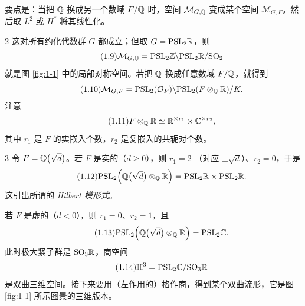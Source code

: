 
要点是：当把 $\mathbb{Q}$ 换成另一个数域 $F/\mathbb{Q}$ 时，空间 $\mathcal{M}_{G,\mathbb{Q}}$ 变成某个空间
$\mathcal{M}_{G,F}$。然后取 $L^2$ 或 $H^*$ 将其线性化。

\begin{srcex}{2}
这对所有约化代数群 $G$ 都成立；但取 $G=\mathrm{PSL}_2\mathbb{R}$，则
\begin{equation}\tag{1.9}\label{eq:1.9}
\mathcal{M}_{G,\mathbb{Q}}
  =\mathrm{PSL}_2\mathbb{Z}\backslash\mathrm{PSL}_2\mathbb{R}/\mathrm{SO}_2
\end{equation}
就是图 \ref{fig:1-1} 中的局部对称空间。若把 $\mathbb{Q}$ 换成任意数域 $F/\mathbb{Q}$，就得到
\begin{equation}\tag{1.10}\label{eq:1.10}
\mathcal{M}_{G,F}
  =\mathrm{PSL}_2(\mathcal{O}_F)\backslash
   \mathrm{PSL}_2(F\otimes_{\mathbb{Q}}\mathbb{R})/K .
\end{equation}
注意
\begin{equation}\tag{1.11}\label{eq:1.11}
F\otimes_{\mathbb{Q}}\mathbb{R}\simeq \mathbb{R}^{\times r_1}\times \mathbb{C}^{\times r_2},
\end{equation}
其中 $r_1$ 是 $F$ 的实嵌入个数，$r_2$ 是复嵌入的共轭对个数。
\end{srcex}


\begin{srcex}{3}
令 $F=\mathbb{Q}\bigl(\sqrt{d}\bigr)$。若 $F$ 是实的（$d\ge 0$），则 $r_1=2$
（对应 $\pm\sqrt{d}$）、$r_2=0$，于是
\begin{equation}\tag{1.12}\label{eq:1.12}
\mathrm{PSL}_2\Bigl(\mathbb{Q}\bigl(\sqrt{d}\bigr)\otimes_{\mathbb{Q}}\mathbb{R}\Bigr)
  =\mathrm{PSL}_2\mathbb{R}\times\mathrm{PSL}_2\mathbb{R} .
\end{equation}
这引出所谓的 \emph{Hilbert 模形式}。

若 $F$ 是虚的（$d<0$），则 $r_1=0$、$r_2=1$，且
\begin{equation}\tag{1.13}\label{eq:1.13}
\mathrm{PSL}_2\Bigl(\mathbb{Q}\bigl(\sqrt{d}\bigr)\otimes_{\mathbb{Q}}\mathbb{R}\Bigr)
  =\mathrm{PSL}_2\mathbb{C} .
\end{equation}
此时极大紧子群是 $\mathrm{SO}_3\mathbb{R}$，商空间
\begin{equation}\tag{1.14}\label{eq:1.14}
\mathbb{H}^3=\mathrm{PSL}_2\mathbb{C}/\mathrm{SO}_3\mathbb{R}
\end{equation}
是双曲三维空间。接下来要用（左作用的）格作商，得到某个双曲流形，它是图 \ref{fig:1-1}
所示图景的三维版本。
\end{srcex}

